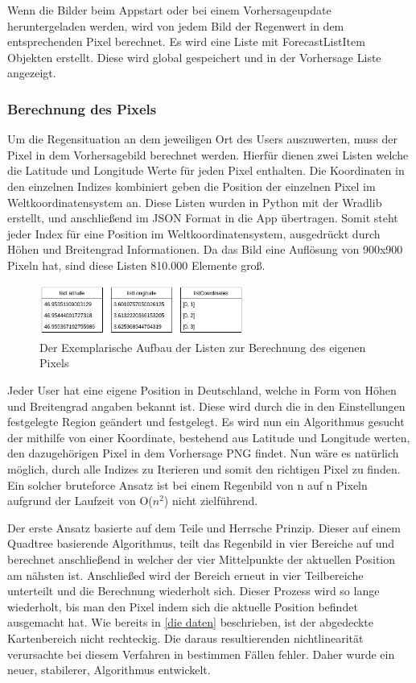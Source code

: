 Wenn die Bilder beim Appstart oder bei einem Vorhersageupdate heruntergeladen werden, wird von jedem Bild der Regenwert 
in dem entsprechenden Pixel berechnet. 
Es wird eine Liste mit ForecastListItem Objekten erstellt. Diese wird global gespeichert und in der Vorhersage Liste angezeigt. 

\subsubsection{Berechnung des Pixels} \label{sec: pixel_berechnung}
Um die Regensituation an dem jeweiligen Ort des Users auszuwerten, muss der Pixel in dem Vorhersagebild berechnet werden. 
Hierfür dienen zwei Listen welche die Latitude und Longitude Werte für jeden Pixel enthalten. 
Die Koordinaten in den einzelnen Indizes kombiniert geben die Position der einzelnen Pixel im Weltkoordinatensystem an.
Diese Listen wurden in Python mit der Wradlib erstellt, und anschließend im JSON Format in die App übertragen. 
Somit steht jeder Index für eine Position im Weltkoordinatensystem, ausgedrückt durch Höhen und Breitengrad Informationen.
Da das Bild eine Auflösung von 900x900 Pixeln hat, sind diese Listen 810.000 Elemente groß.
\begin{figure}[H]
  \centering
  \includegraphics[width=0.6\textwidth,angle=0]{abb/listen_pixel_berechnung.png}
  \caption{Der Exemplarische Aufbau der Listen zur Berechnung des eigenen Pixels}
 \label{fig:sequence_diagram_app_start}
 \end{figure}
 \noindent 
 Jeder User hat eine eigene Position in Deutschland, welche in Form von Höhen und Breitengrad angaben bekannt ist. 
 Diese wird durch die in den Einstellungen festgelegte Region geändert und festgelegt. 
 Es wird nun ein Algorithmus gesucht der mithilfe von einer Koordinate, bestehend aus Latitude und Longitude werten, den dazugehörigen Pixel in dem Vorhersage PNG findet. 
 Nun wäre es natürlich möglich, durch alle Indizes zu Iterieren und somit den richtigen Pixel zu finden.
 Ein solcher bruteforce Ansatz ist bei einem Regenbild von n auf n Pixeln aufgrund der Laufzeit von O($n^2$) nicht zielführend.

 \noindent 
 Der erste Ansatz basierte auf dem Teile und Herrsche Prinzip. 
 Dieser auf einem Quadtree basierende Algorithmus, teilt das Regenbild in vier Bereiche auf und berechnet anschließend in welcher der vier Mittelpunkte der aktuellen Position am nähsten ist. 
 Anschließed wird der Bereich erneut in vier Teilbereiche unterteilt und die Berechnung wiederholt sich. 
 Dieser Prozess wird so lange wiederholt, bis man den Pixel indem sich die aktuelle Position befindet ausgemacht hat.
 Wie bereits in \ref{die daten} beschrieben, ist der abgedeckte Kartenbereich nicht rechteckig. 
 Die daraus resultierenden nichtlinearität verursachte bei diesem Verfahren in bestimmen Fällen fehler. 
 Daher wurde ein neuer, stabilerer, Algorithmus entwickelt. 
 
